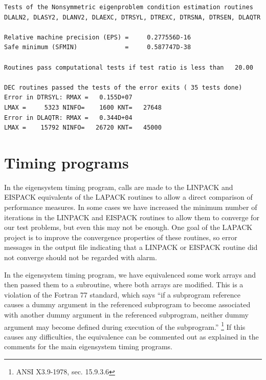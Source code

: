 \documentclass[11pt]{report}
\begin{document}
\begin{verbatim}
Tests of the Nonsymmetric eigenproblem condition estimation routines
DLALN2, DLASY2, DLANV2, DLAEXC, DTRSYL, DTREXC, DTRSNA, DTRSEN, DLAQTR

Relative machine precision (EPS) =     0.277556D-16
Safe minimum (SFMIN)             =     0.587747D-38

Routines pass computational tests if test ratio is less than   20.00

DEC routines passed the tests of the error exits ( 35 tests done)
Error in DTRSYL: RMAX =   0.155D+07
LMAX =     5323 NINFO=    1600 KNT=   27648
Error in DLAQTR: RMAX =   0.344D+04
LMAX =    15792 NINFO=   26720 KNT=   45000
\end{verbatim}

\section{Timing programs}

In the eigensystem timing program, calls are made to the LINPACK
and EISPACK equivalents of the LAPACK routines to allow a direct
comparison of performance measures.
In some cases we have increased the minimum number of
iterations in the LINPACK and EISPACK routines to allow
them to converge for our test problems, but
even this may not be enough.
One goal of the LAPACK project is to improve the convergence
properties of these routines, so error messages in the output
file indicating that a LINPACK or EISPACK routine did not
converge should not be regarded with alarm.

In the eigensystem timing program, we have equivalenced some work
arrays and then passed them to a subroutine, where both arrays are
modified.  This is a violation of the Fortran 77 standard, which
says ``if a subprogram reference causes a dummy argument in the
referenced subprogram to become associated with another dummy
argument in the referenced subprogram, neither dummy argument may
become defined during execution of the subprogram.''
\footnote{ ANSI X3.9-1978, sec. 15.9.3.6}
If this causes any difficulties, the equivalence
can be commented out as explained in the comments for the main
eigensystem timing programs.
\end{document}
